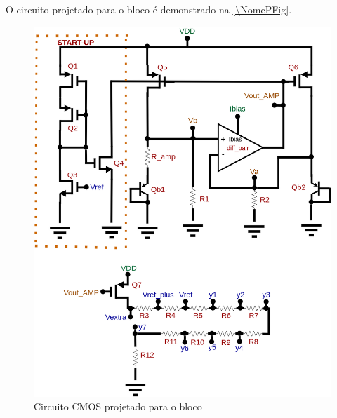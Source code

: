 O circuito projetado para o bloco \'e demonstrado na \autoref{\NomePFig}.

\begin{figure}[htb]
 \centering
    \centering
    \caption{\label{\NomePFig}Circuito CMOS projetado para o bloco \NomeBloco} 
    \includegraphics[scale=0.3]{Circuitos/vref_generator.png}
\end{figure}

